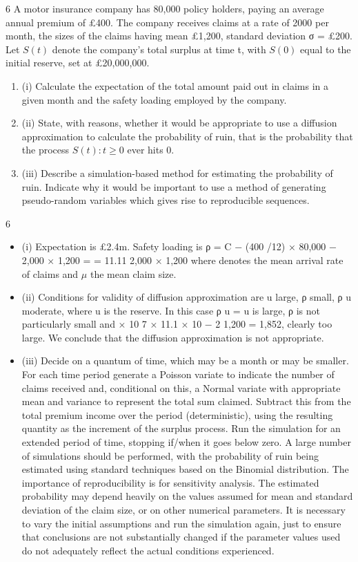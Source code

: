 \documentclass[a4paper,12pt]{article}
\begin{document}
6
A motor insurance company has 80,000 policy holders, paying an average annual
premium of £400. The company receives claims at a rate of 2000 per month, the sizes of the claims having mean £1,200, standard deviation σ = £200.
Let $S(t)$ denote the company’s total surplus at time t, with $S(0)$ equal to the initial reserve, set at £20,000,000.

\begin{enumerate}
    \item 
(i) Calculate the expectation of the total amount paid out in claims in a given month and the safety loading employed by the company.
\item 
(ii) State, with reasons, whether it would be appropriate to use a diffusion approximation to calculate the probability of ruin, that is the probability
that the process ${S(t) : t \geq 0}$ ever hits 0.
\item 
(iii) Describe a simulation-based method for estimating the probability of ruin.
Indicate why it would be important to use a method of generating pseudo-random variables which gives rise to reproducible sequences.
\end{enumerate}
\newpage

6
\begin{itemize}
    \item 

(i)
Expectation is £2.4m. Safety loading is
ρ =
C − \alpha\mu
(400 /12) × 80,000 − 2,000 × 1,200
=
= 11.11%
2,000 × 1,200
\alpha\mu
where \alpha denotes the mean arrival rate of claims and $\mu$ the mean claim
size.
\item (ii)
Conditions for validity of diffusion approximation are
u
\mu
large, ρ small,
ρ u \mu moderate, where u is the reserve.
In this case
ρ u \mu =
u
is large, ρ is not particularly small and
 × 10 7 × 11.1 × 10 − 2
1,200
= 1,852, clearly too large. We conclude that the
diffusion approximation is not appropriate.
\item (iii)
Decide on a quantum of time, which may be a month or may be smaller.
For each time period generate a Poisson variate to indicate the number of
claims received and, conditional on this, a Normal variate with
appropriate mean and variance to represent the total sum claimed.
Subtract this from the total premium income over the period
(deterministic), using the resulting quantity as the increment of the
surplus process. Run the simulation for an extended period of time,
stopping if/when it goes below zero. A large number of simulations should
be performed, with the probability of ruin being estimated using standard
techniques based on the Binomial distribution.
The importance of reproducibility is for sensitivity analysis. The
estimated probability may depend heavily on the values assumed for
mean and standard deviation of the claim size, or on other numerical
parameters. It is necessary to vary the initial assumptions and run the
simulation again, just to ensure that conclusions are not substantially
changed if the parameter values used do not adequately reflect the actual
conditions experienced.
\end{itemize}
\end{document}
